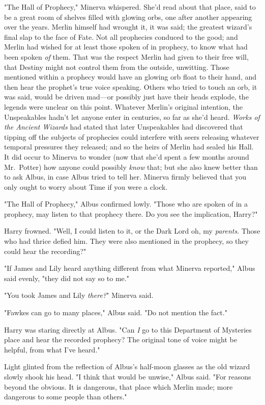 "The Hall of Prophecy," Minerva whispered. She'd read about that place, said to
be a great room of shelves filled with glowing orbs, one after another
appearing over the years. Merlin himself had wrought it, it was said; the
greatest wizard's final slap to the face of Fate. Not all prophecies conduced
to the good; and Merlin had wished for at least those spoken of in prophecy, to
know what had been spoken \emph{of} them. That was the respect Merlin had given
to their free will, that Destiny might not control them from the outside,
unwitting. Those mentioned within a prophecy would have an glowing orb float to
their hand, and then hear the prophet's true voice speaking. Others who tried
to touch an orb, it was said, would be driven mad---or possibly just have their
heads explode, the legends were unclear on this point. Whatever Merlin's
original intention, the Unspeakables hadn't let anyone enter in centuries, so
far as she'd heard. \emph{Works of the Ancient Wizards} had stated that later
Unspeakables had discovered that tipping off the subjects of prophecies could
interfere with seers releasing whatever temporal pressures they released; and
so the heirs of Merlin had sealed his Hall. It did occur to Minerva to wonder
(now that she'd spent a few months around Mr.~Potter) how anyone could possibly
\emph{know} that; but she also knew better than to ask Albus, in case Albus
tried to tell her. Minerva firmly believed that you only ought to worry about
Time if you were a clock.

"The Hall of Prophecy," Albus confirmed lowly. "Those who are spoken of in a
prophecy, may listen to that prophecy there. Do you see the implication, Harry?"

Harry frowned. "Well, I could listen to it, or the Dark Lord{\el} oh, my
\emph{parents}. Those who had thrice defied him. They were also mentioned in
the prophecy, so they could hear the recording?"

"If James and Lily heard anything different from what Minerva reported," Albus
said evenly, "they did not say so to me."

"You took James and Lily \emph{there?}" Minerva said.

"Fawkes can go to many places," Albus said. "Do not mention the fact."

Harry was staring directly at Albus. "Can \emph{I} go to this Department of
Mysteries place and hear the recorded prophecy? The original tone of voice
might be helpful, from what I've heard."

Light glinted from the reflection of Albus's half-moon glasses as the old
wizard slowly shook his head. "I think that would be unwise," Albus said. "For
reasons beyond the obvious. It is dangerous, that place which Merlin made; more
dangerous to some people than others."

